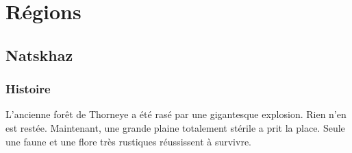 \section{Régions}
\subsection{Natskhaz}
\subsubsection{Histoire}
\hypertarget{natskhaz}{}L'ancienne forêt de Thorneye a été rasé par une gigantesque explosion.
Rien n'en est restée.
Maintenant, une grande plaine totalement stérile a prit la place.
Seule une faune et une flore très rustiques réussissent à survivre.

